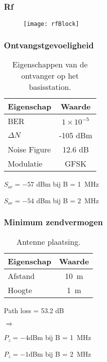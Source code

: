 
\begin{frame}
    \frametitle{Rf}

    \begin{figure}
        \centering
        \texttt{[image: rfBlock]}
    \end{figure}

\end{frame}


\begin{frame}
    \frametitle{Ontvangstgevoeligheid}

    \begin{table}
        \centering
        \begin{tabular}{l|c}
            Eigenschap & Waarde \\\hline
            BER & $1\times10^{-5}$ \\
            $\Delta N$ & -105 dBm \\
            Noise Figure & 12.6 dB \\
            Modulatie & GFSK \\
        \end{tabular}
        \caption{Eigenschappen van de ontvanger op het basisstation.}
    \end{table}

    \pause 

    $S_{or}=-57$ dBm bij B = \qty{1}{\mega\hertz}

    $S_{or}=-54$ dBm bij B = \qty{2}{\mega\hertz}

\end{frame}

\begin{frame}
    \frametitle{Minimum zendvermogen}

    \begin{table}
        \centering
        \begin{tabular}{l|c}
            Eigenschap & Waarde \\\hline
            Afstand & \qty{10}{\meter} \\
            Hoogte & \qty{1}{\meter} \\
        \end{tabular}
        \caption{Antenne plaatsing.}
    \end{table}

    Path loss = 53.2 dB

    \pause

    $\Rightarrow$

    $P_{z}=-4$dBm bij B = \qty{1}{\mega\hertz}

    $P_{z}=-1$dBm bij B = \qty{2}{\mega\hertz}
\end{frame}

